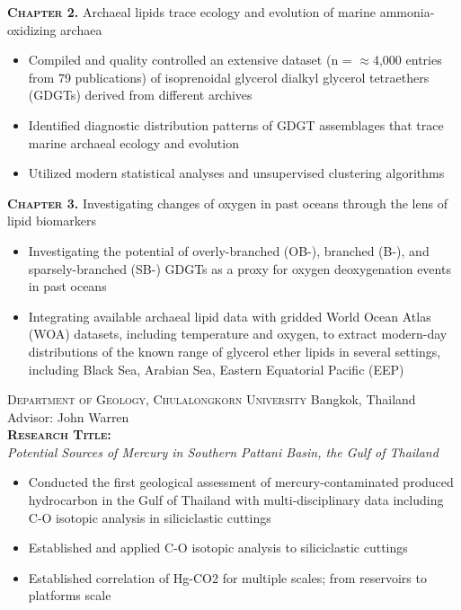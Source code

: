 \documentclass[10pt, letter]{article}
\begin{document}
\bigskip
\textbf{\textsc{Chapter 2.}} Archaeal lipids trace ecology and evolution of marine ammonia-oxidizing archaea
\begin{itemize}[leftmargin=*]
    \item Compiled and quality controlled an extensive dataset (n = $\approx$4,000 entries from 79 publications) of isoprenoidal glycerol dialkyl glycerol tetraethers (GDGTs) derived from different archives
    \item Identified diagnostic distribution patterns of GDGT assemblages that trace marine archaeal ecology and evolution
    \item Utilized modern statistical analyses and unsupervised clustering algorithms
\end{itemize}    


\textbf{\textsc{Chapter 3.}} Investigating changes of oxygen in past oceans through the lens of lipid biomarkers
\begin{itemize}[leftmargin=*]
    \item Investigating the potential of overly-branched (OB-), branched (B-), and sparsely-branched (SB-) GDGTs as a proxy for oxygen deoxygenation events in past oceans
    \item Integrating available archaeal lipid data with gridded World Ocean Atlas (WOA) datasets, including temperature and oxygen, to extract modern-day distributions of the known range of glycerol ether lipids in several settings, including Black Sea, Arabian Sea, Eastern Equatorial Pacific (EEP)
\end{itemize}  

\bigskip
\textsc{Department of Geology, Chulalongkorn University} \hfill Bangkok, Thailand \\
Advisor: John Warren \\

\textbf{\textsc{Research Title:}} \\
\textit{Potential Sources of Mercury in Southern Pattani Basin, the Gulf of Thailand} 

\begin{itemize}[leftmargin=*]
    \item Conducted the first geological assessment of mercury-contaminated produced hydrocarbon in the Gulf of Thailand with multi-disciplinary data including C-O isotopic analysis in siliciclastic cuttings
    \item Established and applied C-O isotopic analysis to siliciclastic cuttings
    \item Established correlation of Hg-CO2 for multiple scales; from reservoirs to platforms scale
\end{itemize}  
\end{document}
